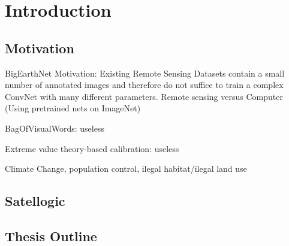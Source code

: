 
\chapter{Introduction} %

\label{Chapter1} %


\newcommand{\keyword}[1]{\textbf{#1}}
\newcommand{\tabhead}[1]{\textbf{#1}}
\newcommand{\code}[1]{\texttt{#1}}
\newcommand{\file}[1]{\texttt{\bfseries#1}}
\newcommand{\option}[1]{\texttt{\itshape#1}}


\section{Motivation}

BigEarthNet Motivation:
Existing Remote Sensing Datasets contain a small number of annotated images and therefore do not suffice to train a complex ConvNet with many different parameters.
Remote sensing versus Computer (Using pretrained nets on ImageNet)


BagOfVisualWords: useless



Extreme value theory-based calibration: useless




Climate Change, population control, ilegal habitat/ilegal land use


\section{Satellogic}




\section{Thesis Outline}